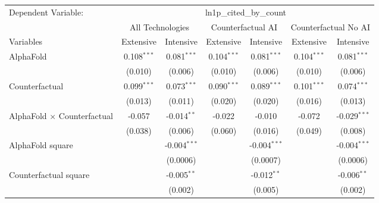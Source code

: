 \begingroup
\centering
\begin{tabular}{lcccccc}
   \tabularnewline \midrule \midrule
   Dependent Variable: & \multicolumn{6}{c}{ln1p\_cited\_by\_count}\\
 & \multicolumn{2}{c}{All Technologies} & \multicolumn{2}{c}{Counterfactual AI} & \multicolumn{2}{c}{Counterfactual No AI} \\
\cmidrule(lr){1-1}\cmidrule(lr){2-3} \cmidrule(lr){4-5} \cmidrule(lr){6-7}
Variables & \multicolumn{1}{c}{Extensive} & \multicolumn{1}{c}{Intensive} & \multicolumn{1}{c}{Extensive} & \multicolumn{1}{c}{Intensive} & \multicolumn{1}{c}{Extensive} & \multicolumn{1}{c}{Intensive} \\
\cmidrule(lr){1-1}\cmidrule(lr){2-2} \cmidrule(lr){3-3} \cmidrule(lr){4-4} \cmidrule(lr){5-5} \cmidrule(lr){6-6} \cmidrule(lr){7-7}
   AlphaFold                          & 0.108$^{***}$ & 0.081$^{***}$  & 0.104$^{***}$ & 0.081$^{***}$  & 0.104$^{***}$ & 0.081$^{***}$\\   
                                      & (0.010)       & (0.006)        & (0.010)       & (0.006)        & (0.010)       & (0.006)\\   
   Counterfactual                     & 0.099$^{***}$ & 0.073$^{***}$  & 0.090$^{***}$ & 0.089$^{***}$  & 0.101$^{***}$ & 0.074$^{***}$\\   
                                      & (0.013)       & (0.011)        & (0.020)       & (0.020)        & (0.016)       & (0.013)\\   
   AlphaFold $\times$ Counterfactual  & -0.057        & -0.014$^{**}$  & -0.022        & -0.010         & -0.072        & -0.029$^{***}$\\   
                                      & (0.038)       & (0.006)        & (0.060)       & (0.016)        & (0.049)       & (0.008)\\   
   AlphaFold square                   &               & -0.004$^{***}$ &               & -0.004$^{***}$ &               & -0.004$^{***}$\\   
                                      &               & (0.0006)       &               & (0.0007)       &               & (0.0006)\\   
   Counterfactual square              &               & -0.005$^{**}$  &               & -0.012$^{**}$  &               & -0.006$^{**}$\\   
                                      &               & (0.002)        &               & (0.005)        &               & (0.002)\\   

\end{tabular}
